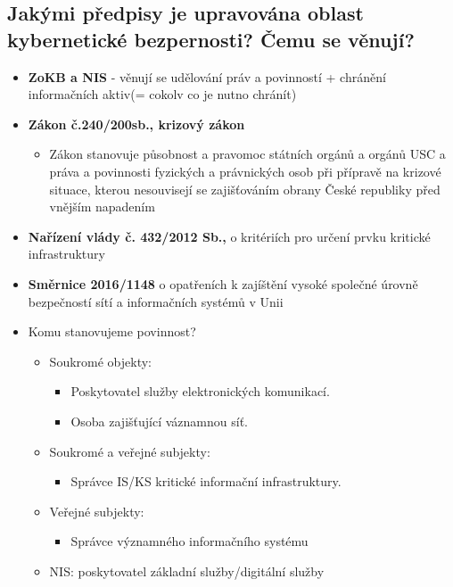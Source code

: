 \subsection{Jakými předpisy je upravována oblast kybernetické bezpernosti? Čemu se věnují?}
\begin{itemize}

\item \textbf{ZoKB a NIS} - věnují se udělování práv a povinností + chránění informačních aktiv(= cokolv co je nutno chránít)
\item \textbf{Zákon č.240/200sb., krizový zákon}
    \begin{itemize}
        \item Zákon stanovuje působnost a pravomoc státních orgánů a orgánů USC a práva a povinnosti fyzických a právnických osob při přípravě na krizové situace, kterou nesouvisejí se zajišťováním obrany České republiky před vnějším napadením
    \end{itemize}
    \item \textbf{Nařízení vlády č. 432/2012 Sb.,} o kritériích pro určení prvku kritické infrastruktury
    \item \textbf{Směrnice 2016/1148} o opatřeních k zajíštění vysoké společné úrovně bezpečností sítí a informačních systémů v Unii
    \item Komu stanovujeme povinnost?
    \begin{itemize}
        \item Soukromé objekty:
        \begin{itemize}
            \item Poskytovatel služby elektronických komunikací.
            \item Osoba zajišťující váznamnou síť.
        \end{itemize}
        \item Soukromé a veřejné subjekty:
        \begin{itemize}
            \item Správce IS/KS kritické informační infrastruktury.
        \end{itemize}
        \item Veřejné subjekty:
        \begin{itemize}
            \item Správce významného informačního systému
        \end{itemize}
        \item NIS: poskytovatel základní služby/digitální služby
    \end{itemize}
\end{itemize}

